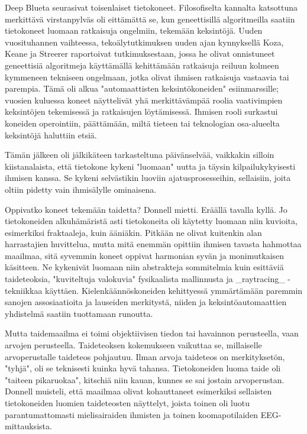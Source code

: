 Deep Blueta seurasivat toisenlaiset tietokoneet. Filosofiselta kannalta katsottuna merkittävä virstanpylväs oli eittämättä se, kun geneettisillä algoritmeilla saatiin tietokoneet luomaan ratkaisuja ongelmiin, tekemään keksintöjä. Uuden vuosituhannen vaihteessa, tekoälytutkimuksen uuden ajan kynnyksellä Koza, Keane ja Streerer raportoivat tutkimuksestaan, jossa he olivat onnistuneet geneettisiä algoritmeja käyttämällä kehittämään ratkaisuja reiluun kolmeen kymmeneen tekniseen ongelmaan, jotka olivat ihmisen ratkaisuja vastaavia tai parempia. Tämä oli alkua "automaattisten keksintökoneiden" esiinmarssille; vuosien kuluessa koneet näyttelivät yhä merkittävämpää roolia vaativimpien keksintöjen tekemisessä ja ratkaisujen löytämisessä. Ihmisen rooli surkastui koneiden operointiin, päättämään, miltä tieteen tai teknologian osa-alueelta keksintöjä haluttiin etsiä.


Tämän jälkeen oli jälkikäteen tarkasteltuna päivänselvää, vaikkakin silloin kiistanalaista, että tietokone kykeni "luomaan" uutta ja täysin kilpailukykyisesti ihmisen kanssa. Se kykeni selvästikin luoviin ajatusprosesseihin, sellaisiin, joita oltiin pidetty vain ihmisälylle ominaisena.


Oppivatko koneet tekemään taidetta? Donnell mietti. Eräällä tavalla kyllä. Jo tietokoneiden alkuhämäristä asti tietokoneita oli käytetty luomaan niin kuvioita, esimerkiksi fraktaaleja, kuin ääniäkin. Pitkään ne olivat kuitenkin alan harrastajien huvittelua, mutta mitä enemmän opittiin ihmisen tavasta hahmottaa maailmaa, sitä syvemmin koneet oppivat harmonian syvän ja monimutkaisen käsitteen. Ne kykenivät luomaan niin abstrakteja sommitelmia kuin esittäviä taideteoksia, "kuviteltuja valokuvia" fysikaalista mallinnusta ja _raytracing_ -tekniikkaa käyttäen. Kielenkäännöskoneiden kehittyessä ymmärtämään paremmin sanojen assosiaatioita ja lauseiden merkitystä, niiden ja keksintöautomaattien yhdistelmä saatiin tuottamaan runoutta.


Mutta taidemaailma ei toimi objektiivisen tiedon tai havainnon perusteella, vaan arvojen perusteella. Taideteoksen kokemukseen vaikuttaa se, millaiselle arvoperustalle taideteos pohjautuu. Ilman arvoja taideteos on merkityksetön, "tyhjä", oli se teknisesti kuinka hyvä tahansa. Tietokoneiden luoma taide oli "taiteen pikaruokaa", kitschiä niin kauan, kunnes se sai jostain arvoperustan. Donnell muisteli, että maailmaa olivat kohauttaneet esimerkiksi sellaisten tietokoneiden luomien taideteosten näyttelyt, joista toinen oli luotu parantumattomasti mielisairaiden ihmisten ja toinen koomapotilaiden EEG-mittauksista.


